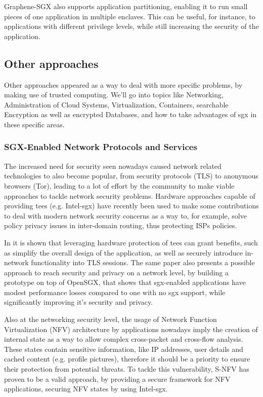 Graphene-SGX also supports application partitioning, enabling it to run small pieces of one application in multiple enclaves. This can be useful, for instance, to applications with different privilege levels, while still increasing the security of the application.
\subsection{Other approaches}


Other approaches appeared as a way to deal with more specific problems, by making use of trusted computing. We'll go into topics like Networking, Administration of Cloud Systems, Virtualization, Containers, searchable Encryption as well as encrypted Databases, and how to take advantages of \gls{sgx} in these specific areas. 



\subsubsection{SGX-Enabled Network Protocols and Services}

The increased need for security seen nowadays caused network related technologies to also become popular, from security protocols (TLS) to anonymous browsers (Tor), leading to a lot of effort by the community to make viable approaches to tackle network security problems. 
Hardware approaches capable of providing \gls{tee}s (e.g. Intel-\gls{sgx}) have recently been used to make some contributions to deal with modern network security concerns as a way to, for example, solve policy privacy issues in inter-domain routing, thus protecting ISPs policies.

In \cite{torSGXPaper} it is shown that leveraging hardware protection of \gls{tee}s can grant benefits, such as simplify the overall design of the application, as well as securely introduce in-network functionality into TLS sessions. The same paper also presents a possible approach to reach security and privacy on a network level, by building a prototype on top of OpenSGX, that shows that \gls{sgx}-enabled applications have modest performance losses compared to one with no \gls{sgx} support, while significantly improving it’s security and privacy.

Also at the networking security level, the usage of Network Function Virtualization (NFV) architecture by applications nowadays imply the creation of internal state as a way to allow complex cross-packet and cross-flow analysis. 
These states contain sensitive information, like IP addresses, user details and cached content (e.g. profile pictures), therefore it should be a priority to ensure their protection from potential threats.
To tackle this vulnerability, S-NFV \cite{sNFVPaper} has proven to be a valid approach, by providing a secure framework for NFV applications, securing NFV states by using Intel-\gls{sgx}.

